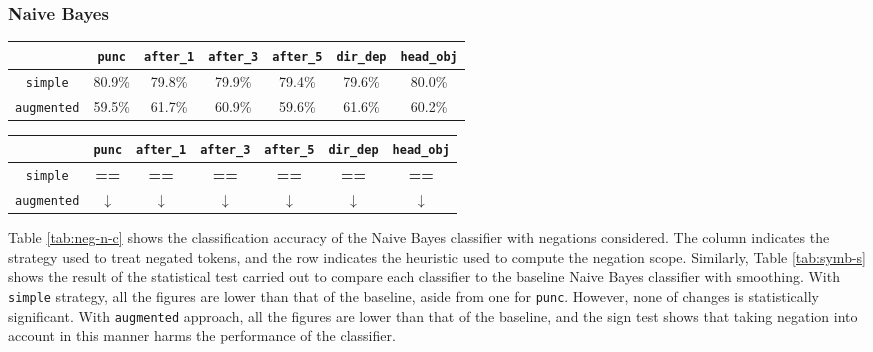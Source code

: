 \subsubsection{Naive Bayes}
\begin{table*}[t]
\centering
\caption{Classification Accuracy of Naive Bayes Classifier with Negation}
\label{tab:neg-n-c}
\begin{tabular}{|c|c|c|c|c|c|c|}
\hline
 & \texttt{punc}& \texttt{after\_1}& \texttt{after\_3}&  \texttt{after\_5} & \texttt{dir\_dep}& \texttt{head\_obj}  \\ \hline
 \texttt{simple} & 80.9\% & 79.8\% & 79.9\%  & 79.4\% & 79.6\% & 80.0\% \\ \hline
\texttt{augmented} & 59.5\% & 61.7\% & 60.9\%  & 59.6\% & 61.6\% & 60.2\%  \\ \hline
\end{tabular}
\end{table*}
\begin{table*}[t]
\centering
\caption{Significance Results of Naive Bayes Classifier with Negation}
\label{tab:neg-n-c}
\begin{tabular}{|c|c|c|c|c|c|c|}
\hline
 & \texttt{punc}& \texttt{after\_1}& \texttt{after\_3}&  \texttt{after\_5} & \texttt{dir\_dep}& \texttt{head\_obj}  \\ \hline
 \texttt{simple} & \textbf{==}& \textbf{==} & \textbf{==}  & \textbf{==}  & \textbf{==} & \textbf{==}\\ \hline
\texttt{augmented} & \textbf{$\downarrow$}& \textbf{$\downarrow$} & \textbf{$\downarrow$}  & \textbf{$\downarrow$}  & \textbf{$\downarrow$} & \textbf{$\downarrow$}\\ \hline
\end{tabular}
\end{table*}
Table \ref{tab:neg-n-c} shows the classification accuracy of the Naive Bayes classifier with negations considered. The column indicates the strategy used to treat negated tokens, and the row indicates the heuristic used to compute the negation scope. Similarly, Table \ref{tab:symb-s} shows the result of the statistical test carried out to compare each classifier to the baseline Naive Bayes classifier with smoothing. With \texttt{simple} strategy, all the figures are lower than that of the baseline, aside from one for \texttt{punc}. However, none of changes is statistically significant. With \texttt{\texttt{augmented}} approach, all the figures are lower than that of the baseline, and the sign test shows that taking negation into account in this manner harms the performance of the classifier.
